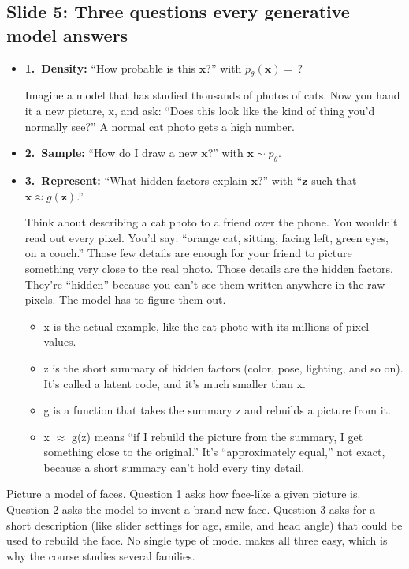\subsection*{Slide 5: Three questions every generative model answers}
\begin{itemize}
\item \textbf{1.\ Density:} ``How probable is this $\mathbf{x}$?'' with $p_\theta(\mathbf{x})=\,?$ \\
    \begin{scriptsize}
    Imagine a model that has studied thousands of photos of cats. 
    Now you hand it a new picture, x, and ask: “Does this look like the kind of thing you’d normally see?” A normal cat photo gets a high number. 
    \end{scriptsize}
\item \textbf{2.\ Sample:} ``How do I draw a new $\mathbf{x}$?'' with $\mathbf{x}\sim p_\theta$.
\item \textbf{3.\ Represent:} ``What hidden factors explain $\mathbf{x}$?'' with ``$\mathbf{z}$ such that $\mathbf{x}\approx g(\mathbf{z})$.'' \\
    \begin{scriptsize}
        Think about describing a cat photo to a friend over the phone. You wouldn’t read out every pixel. You’d say: “orange cat, sitting, facing left, green eyes, on a couch.” Those few details are enough for your friend to picture something very close to the real photo.
        Those details are the hidden factors. They’re “hidden” because you can’t see them written anywhere in the raw pixels. The model has to figure them out.
        \begin{itemize}
            \item x is the actual example, like the cat photo with its millions of pixel values.
            \item z is the short summary of hidden factors (color, pose, lighting, and so on). It’s called a latent code, and it’s much smaller than x.
            \item g is a function that takes the summary z and rebuilds a picture from it.
            \item x $\approx$ g(z) means “if I rebuild the picture from the summary, I get something close to the original.” It’s “approximately equal,” not exact, because a short summary can’t hold every tiny detail.
        \end{itemize}
    \end{scriptsize}
\end{itemize}
Picture a model of faces. Question 1 asks how face-like a given picture is. Question 2 asks the model to invent a brand-new face. Question 3 asks for a short description (like slider settings for age, smile, and head angle) that could be used to rebuild the face. No single type of model makes all three easy, which is why the course studies several families.

